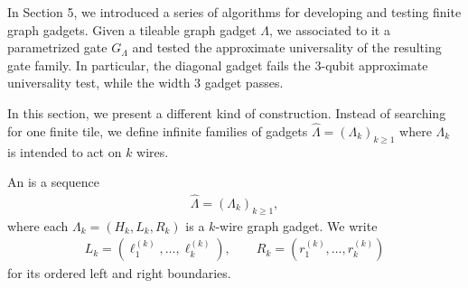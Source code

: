 In Section 5, we introduced a series of algorithms for developing and testing finite graph gadgets. Given a tileable graph gadget $\Lambda$, we associated to it a parametrized gate $G_\Lambda$ and tested the approximate universality of the resulting gate family. In particular, the diagonal gadget fails the 3-qubit approximate universality test, while the width 3 gadget passes. 

In this section, we present a different kind of construction. Instead of searching for one finite tile, we define infinite families of gadgets $\hat\Lambda=(\Lambda_k)_{k\geq 1}$ where $\Lambda_k$ is intended to act on $k$ wires. 

\begin{definition}
\label{def:iterative-gadget}
An  is a sequence
\begin{align}
    \hat\Lambda=(\Lambda_k)_{k\geq 1},
\end{align}
where each $\Lambda_k=(H_k,L_k,R_k)$ is a $k$-wire graph gadget. We write
\begin{align}
    L_k=(\ell^{(k)}_1,\ldots,\ell^{(k)}_k),
    \qquad
    R_k=(r^{(k)}_1,\ldots,r^{(k)}_k)
\end{align}
for its ordered left and right boundaries.
\end{definition}

